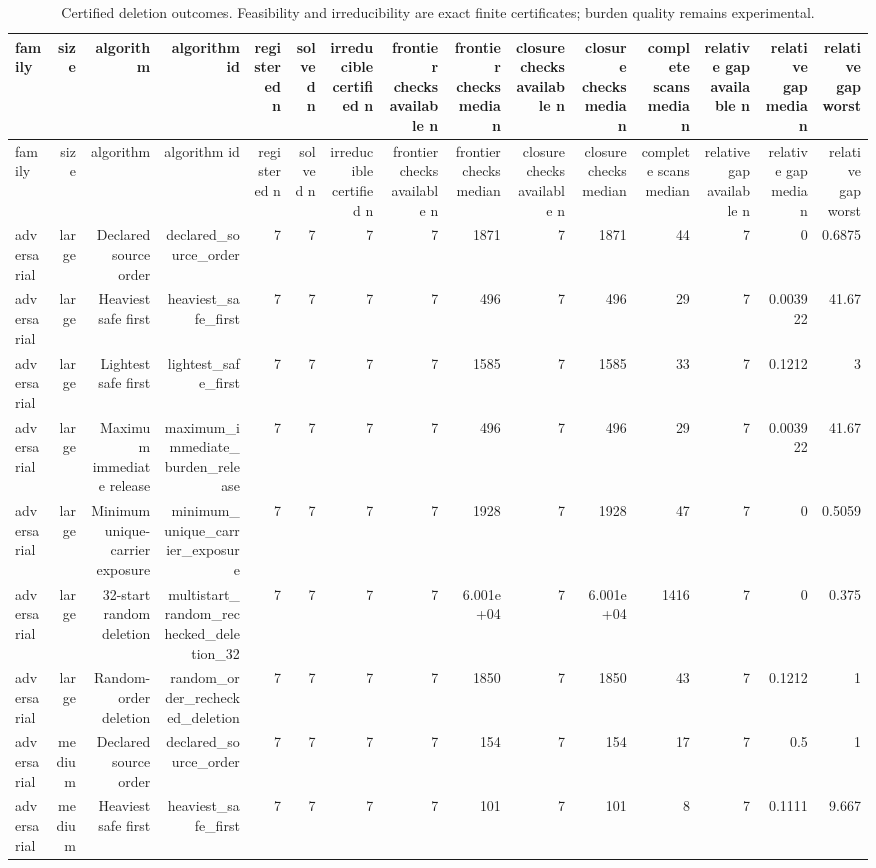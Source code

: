 {\footnotesize
\begin{longtable}{lrrrrrrrrrrrrrr}
\caption{Certified deletion outcomes. Feasibility and irreducibility are exact finite certificates; burden quality remains experimental.}\label{tab:aor-certified-deletion}\\
\toprule
family & size & algorithm & algorithm id & registered n & solved n & irreducible certified n & frontier checks available n & frontier checks median & closure checks available n & closure checks median & complete scans median & relative gap available n & relative gap median & relative gap worst \\
\midrule
\endfirsthead
\toprule
family & size & algorithm & algorithm id & registered n & solved n & irreducible certified n & frontier checks available n & frontier checks median & closure checks available n & closure checks median & complete scans median & relative gap available n & relative gap median & relative gap worst \\
\midrule
\endhead
adversarial & large & Declared source order & declared\_source\_order & 7 & 7 & 7 & 7 & 1871 & 7 & 1871 & 44 & 7 & 0 & 0.6875 \\
adversarial & large & Heaviest safe first & heaviest\_safe\_first & 7 & 7 & 7 & 7 & 496 & 7 & 496 & 29 & 7 & 0.003922 & 41.67 \\
adversarial & large & Lightest safe first & lightest\_safe\_first & 7 & 7 & 7 & 7 & 1585 & 7 & 1585 & 33 & 7 & 0.1212 & 3 \\
adversarial & large & Maximum immediate release & maximum\_immediate\_burden\_release & 7 & 7 & 7 & 7 & 496 & 7 & 496 & 29 & 7 & 0.003922 & 41.67 \\
adversarial & large & Minimum unique-carrier exposure & minimum\_unique\_carrier\_exposure & 7 & 7 & 7 & 7 & 1928 & 7 & 1928 & 47 & 7 & 0 & 0.5059 \\
adversarial & large & 32-start random deletion & multistart\_random\_rechecked\_deletion\_32 & 7 & 7 & 7 & 7 & 6.001e+04 & 7 & 6.001e+04 & 1416 & 7 & 0 & 0.375 \\
adversarial & large & Random-order deletion & random\_order\_rechecked\_deletion & 7 & 7 & 7 & 7 & 1850 & 7 & 1850 & 43 & 7 & 0.1212 & 1 \\
adversarial & medium & Declared source order & declared\_source\_order & 7 & 7 & 7 & 7 & 154 & 7 & 154 & 17 & 7 & 0.5 & 1 \\
adversarial & medium & Heaviest safe first & heaviest\_safe\_first & 7 & 7 & 7 & 7 & 101 & 7 & 101 & 8 & 7 & 0.1111 & 9.667 \\

\end{longtable}}
